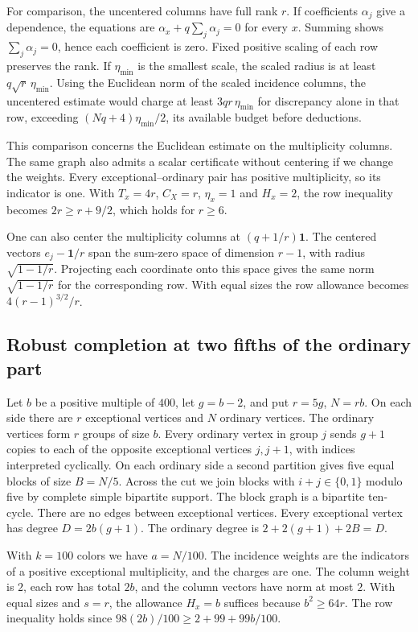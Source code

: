 \documentclass[11pt]{article}
\begin{document}
For comparison, the uncentered columns have full rank \(r\). If coefficients \(\alpha_j\) give a dependence, the equations are \(\alpha_x+q\sum_j\alpha_j=0\) for every \(x\). Summing shows \(\sum_j\alpha_j=0\), hence each coefficient is zero. Fixed positive scaling of each row preserves the rank. If \(\eta_{\min}\) is the smallest scale, the scaled radius is at least \(q\sqrt r\,\eta_{\min}\). Using the Euclidean norm of the scaled incidence columns, the uncentered estimate would charge at least \(3qr\,\eta_{\min}\) for discrepancy alone in that row, exceeding \((Nq+4)\eta_{\min}/2\), its available budget before deductions.

This comparison concerns the Euclidean estimate on the multiplicity columns. The same graph also admits a scalar certificate without centering if we change the weights. Every exceptional--ordinary pair has positive multiplicity, so its indicator is one. With \(T_x=4r\), \(C_X=r\), \(\eta_x=1\) and \(H_x=2\), the row inequality becomes \(2r\ge r+9/2\), which holds for \(r\ge6\).

One can also center the multiplicity columns at \((q+1/r)\mathbf1\). The centered vectors \(e_j-\mathbf1/r\) span the sum-zero space of dimension \(r-1\), with radius \(\sqrt{1-1/r}\). Projecting each coordinate onto this space gives the same norm \(\sqrt{1-1/r}\) for the corresponding row. With equal sizes the row allowance becomes \(4(r-1)^{3/2}/r\).

\subsection{Robust completion at two fifths of the ordinary part}\label{sec:two-fifths}

Let \(b\) be a positive multiple of \(400\), let \(g=b-2\), and put \(r=5g\), \(N=rb\). On each side there are \(r\) exceptional vertices and \(N\) ordinary vertices. The ordinary vertices form \(r\) groups of size \(b\). Every ordinary vertex in group \(j\) sends \(g+1\) copies to each of the opposite exceptional vertices \(j,j+1\), with indices interpreted cyclically. On each ordinary side a second partition gives five equal blocks of size \(B=N/5\). Across the cut we join blocks with \(i+j\in\{0,1\}\) modulo five by complete simple bipartite support. The block graph is a bipartite ten-cycle. There are no edges between exceptional vertices. Every exceptional vertex has degree \(D=2b(g+1)\). The ordinary degree is \(2+2(g+1)+2B=D\).

With \(k=100\) colors we have \(a=N/100\). The incidence weights are the indicators of a positive exceptional multiplicity, and the charges are one. The column weight is \(2\), each row has total \(2b\), and the column vectors have norm at most \(2\). With equal sizes and \(s=r\), the allowance \(H_x=b\) suffices because \(b^2\ge64r\). The row inequality holds since \(98(2b)/100\ge 2+99+99b/100\).
\end{document}
